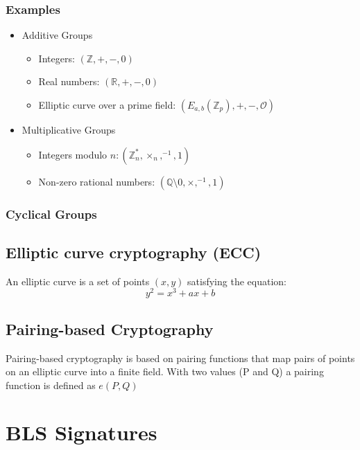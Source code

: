 \documentclass[a4paper,12pt]{scrartcl}
\begin{document}
\subsubsection{Examples}
\begin{itemize}
	\item Additive Groups
	\begin{itemize}
		\item Integers: \( (\mathbb{Z},+,-,0) \)
		\item Real numbers: \( (\mathbb{R},+,-,0) \)
		\item Elliptic curve over a prime field: \( (E_{a,b}(\mathbb{Z}_{p}),+,-, \mathcal{O}) \)
	\end{itemize}
	\item Multiplicative Groups
	\begin{itemize}
		\item Integers modulo \( n: ( \mathbb{Z}_{n}^*, \times_{n}, ^{-1}, 1) \)
		\item Non-zero rational numbers: \( ( \mathbb{Q} \setminus 0, \times, ^{-1}, 1) \)
	\end{itemize}
\end{itemize}

\subsubsection{Cyclical Groups}

\subsection{Elliptic curve cryptography (ECC)}
An elliptic curve is a set of points \((x,y)\) satisfying the equation\cite[Slide 6.4]{crypto-slides-haenni}:
\begin{equation*}
y^2 = x^3 + ax + b
\end{equation*}

\subsection{Pairing-based Cryptography}
Pairing-based cryptography is based on pairing functions that map pairs of points on an elliptic curve into a finite field.\cite{security-wiki-pbc}
\newline
With two values (P and Q) a pairing function is defined as \( e(P,Q) \)

\pagebreak

\section{BLS Signatures}
\end{document}
